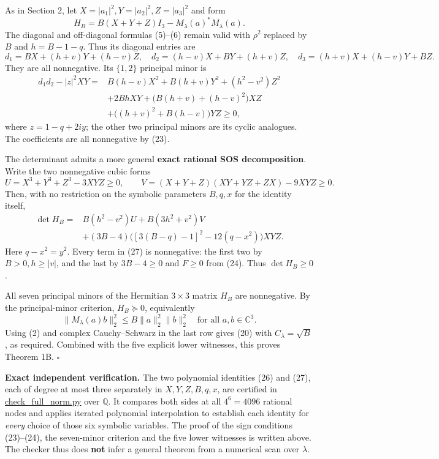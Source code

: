 \documentclass[
  11pt,
]{article}
\begin{document}
As in Section 2, let \(X=|a_1|^2,Y=|a_2|^2,Z=|a_3|^2\) and form \[
H_B=B(X+Y+Z)I_3-M_\lambda(a)^*M_\lambda(a).
\] The diagonal and off-diagonal formulas (5)--(6) remain valid with
\(\rho^2\) replaced by \(B\) and \(h=B-1-q\). Thus its diagonal entries
are \[
d_1=BX+(h+v)Y+(h-v)Z,\quad
d_2=(h-v)X+BY+(h+v)Z,\quad
d_3=(h+v)X+(h-v)Y+BZ.
\tag{25}
\] They are all nonnegative. Its \(\{1,2\}\) principal minor is \[
\begin{aligned}
d_1d_2-|z|^2XY={}&
B(h-v)X^2+B(h+v)Y^2+(h^2-v^2)Z^2\\
&+2BhXY+
\bigl(B(h+v)+(h-v)^2\bigr)XZ\\
&+\bigl((h+v)^2+B(h-v)\bigr)YZ\ge0,
\end{aligned}
\tag{26}
\] where \(z=1-q+2iy\); the other two principal minors are its cyclic
analogues. The coefficients are all nonnegative by (23).

The determinant admits a more general \textbf{exact rational SOS
decomposition}. Write the two nonnegative cubic forms \[
U=X^3+Y^3+Z^3-3XYZ\ge0,
\qquad
V=(X+Y+Z)(XY+YZ+ZX)-9XYZ\ge0.
\] Then, with no restriction on the symbolic parameters \(B,q,x\) for
the identity itself, \[
\boxed{
\begin{aligned}
\det H_B={}&
B(h^2-v^2)U+B(3h^2+v^2)V\\
&+(3B-4)\Big([3(B-q)-1]^2-12(q-x^2)\Big)XYZ .
\end{aligned}}
\tag{27}
\] Here \(q-x^2=y^2\). Every term in (27) is nonnegative: the first two
by \(B>0,h\ge|v|\), and the last by \(3B-4\ge0\) and \(F\ge0\) from
(24). Thus \(\det H_B\ge0\).

All seven principal minors of the Hermitian \(3\times3\) matrix \(H_B\)
are nonnegative. By the principal-minor criterion, \(H_B\succeq0\),
equivalently \[
\|M_\lambda(a)b\|_2^2\le
B\|a\|_2^2\|b\|_2^2
\quad\text{for all }a,b\in\mathbb C^3.
\] Using (2) and complex Cauchy--Schwarz in the last row gives (20) with
\(C_\lambda=\sqrt B\), as required. Combined with the five explicit
lower witnesses, this proves Theorem 1B. \(\square\)

\textbf{Exact independent verification.} The two polynomial identities
(26) and (27), each of degree at most three separately in
\(X,Y,Z,B,q,x\), are certified in
\href{../../notes/complex-permanent-determinant/check_full_norm.py}{check\_full\_norm.py}
over \(\mathbb Q\). It compares both sides at all \(4^6=4096\) rational
nodes and applies iterated polynomial interpolation to establish each
identity for \emph{every} choice of those six symbolic variables. The
proof of the sign conditions (23)--(24), the seven-minor criterion and
the five lower witnesses is written above. The checker thus does
\textbf{not} infer a general theorem from a numerical scan over
\(\lambda\).
\end{document}
